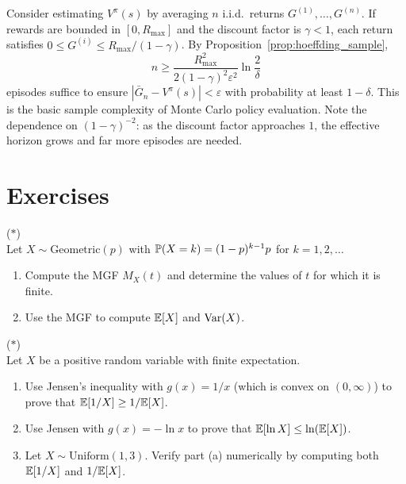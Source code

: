 \documentclass[11pt,a4paper]{article}
\begin{document}
\begin{rlconnection}[title={Monte Carlo Policy Evaluation Sample
    Complexity}]
Consider estimating $V^\pi(s)$ by averaging $n$ i.i.d.\ returns
$G^{(1)}, \ldots, G^{(n)}$. If rewards are bounded in $[0, R_{\max}]$
and the discount factor is $\gamma < 1$, each return satisfies
$0 \leq G^{(i)} \leq R_{\max}/(1 - \gamma)$. By
Proposition~\ref{prop:hoeffding_sample},
\[
    n \geq \frac{R_{\max}^2}{2(1-\gamma)^2 \varepsilon^2}
    \ln\frac{2}{\delta}
\]
episodes suffice to ensure
$|\bar{G}_n - V^\pi(s)| < \varepsilon$ with probability at least
$1 - \delta$. This is the basic sample complexity of Monte Carlo
policy evaluation. Note the dependence on $(1-\gamma)^{-2}$: as the
discount factor approaches $1$, the effective horizon grows and far
more episodes are needed.
\end{rlconnection}


\section{Exercises}
\label{sec:exercises}

\begin{exercise}
\textnormal{(\(\ast\))} \\
Let $X \sim \mathrm{Geometric}(p)$ with
$\mathbb{P}(X = k) = (1-p)^{k-1}p$ for $k = 1, 2, \ldots$
\begin{enumerate}[nosep,label=(\alph*)]
    \item Compute the MGF $M_X(t)$ and determine the values of $t$
    for which it is finite.
    \item Use the MGF to compute $\mathbb{E}[X]$ and $\operatorname{Var}(X)$.
\end{enumerate}
\end{exercise}

\begin{exercise}
\textnormal{(\(\ast\))} \\
Let $X$ be a positive random variable with finite expectation.
\begin{enumerate}[nosep,label=(\alph*)]
    \item Use Jensen's inequality with $g(x) = 1/x$ (which is convex
    on $(0, \infty)$) to prove that $\mathbb{E}[1/X] \geq 1/\mathbb{E}[X]$.
    \item Use Jensen with $g(x) = -\ln x$ to prove that
    $\mathbb{E}[\ln X] \leq \ln(\mathbb{E}[X])$.
    \item Let $X \sim \mathrm{Uniform}(1, 3)$. Verify part (a)
    numerically by computing both $\mathbb{E}[1/X]$ and $1/\mathbb{E}[X]$.
\end{enumerate}
\end{exercise}
\end{document}
